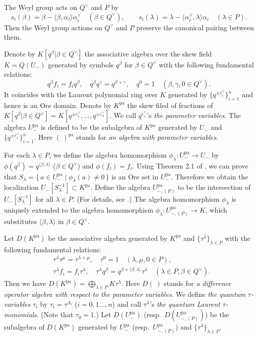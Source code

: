 \documentclass[12pt,twoside]{article}
\newcommand\tU{{\widetilde U}}
\newcommand\bra{\langle}
\newcommand\ket{\rangle}
\newcommand\av{\alpha^\vee}
\newcommand\eps{\varepsilon}
\newcommand\epsv{\eps^\vee}
\newcommand\Qv{Q^\vee}
\newcommand\pa{{\mathrm{pa}}}
\theoremstyle{plain} %
\theoremstyle{definition} %
\theoremstyle{definition} %
\numberwithin{theorem}{section}
\numberwithin{equation}{section}
\numberwithin{figure}{section}
\numberwithin{table}{section}
\begin{document}
The Weyl group acts on $\Qv$ and $P$ by
\begin{equation*}
 s_i(\beta) = \beta - \bra\beta,\alpha_i\ket\av_i \quad (\beta\in\Qv), \qquad
 s_i(\lambda) = \lambda - \bra\av_i,\lambda\ket\alpha_i \quad (\lambda\in P).
\end{equation*}
Then the Weyl group actions on $\Qv$ and $P$ preserve the canonical pairing
between them.
 
Denote by $K[q^\beta|\beta\in\Qv]$ the associative algebra over 
the skew field $K=Q(U_-)$ generated by symbols $q^\beta$
for $\beta\in\Qv$ with the following fundamental relations:
\begin{equation*}
 q^\beta f_i = f_i q^\beta, \quad
 q^\beta q^\gamma = q^{\beta+\gamma}, \quad
 q^0 = 1 \quad (\beta,\gamma,0\in\Qv).
\end{equation*}
It coincides with the Laurent polynomial ring over $K$ 
generated by $\{q^{\pm\epsv_i}\}_{i=1}^n$ 
and hence is an Ore domain.
Denote by $K^\pa$ the skew filed of fractions 
of $K[q^\beta|\beta\in\Qv]=K[q^{\pm\epsv_1},\ldots,q^{\pm\epsv_n}]$.
We call $q^{\epsv_i}$'s {\em the parameter variables}. 
The algebra $U_-^\pa$ %
is defined to be the subalgebra of $K^\pa$
generated by $U_-$ %
and $\{q^{\pm\epsv_i}\}_{i=1}^n$.
Here $(\ )^\pa$ stands for {\em an algebra with parameter variables}.

For each $\lambda\in P$, 
we define the algebra homomorphism $\phi_\lambda:U_-^\pa\to U_-$ 
by $\phi(q^\beta)=q^{\bra\beta,\lambda\ket}$ ($\beta\in\Qv$) 
and $\phi(f_i)=f_i$.
Using Theorem 2.1 of \cite{S-1971}, we can prove that 
$S_\lambda = \{\, a\in U_-^\pa \mid \phi_\lambda(a)\ne 0\,\}$
is an Ore set in $U_-^\pa$. Therefore we obtain the localization
$U_-[S_\lambda^{-1}]\subset K^\pa$.
Define the algebra $U_{-,(P)}^\pa$ to be the intersection 
of $U_-[S_\lambda^{-1}]$ for all $\lambda\in P$.
(For details, see \cite{Kuroki2012a}.)
The algebra homomorphism $\phi_\lambda$ is uniquely extended to
the algebra homomorphism $\phi_\lambda:U_{-,(P)}^\pa\to K$,
which substitutes $\bra\beta,\lambda\ket$ in $\beta\in\Qv$.

Let $D(K^\pa)$ be the associative algebra generated by $K^\pa$ and $\{\tau^\lambda\}_{\lambda\in P}$
with the following fundamental relations:
\begin{align*}
 &
 \tau^\lambda\tau^\mu = \tau^{\lambda+\mu}, \quad
 \tau^0 = 1 \quad (\lambda,\mu,0\in P),
 \\ &
 \tau^\lambda f_i = f_i \tau^\lambda, \quad
 \tau^\lambda q^\beta = q^{\beta + \bra\beta,\lambda\ket} \tau^\lambda \quad
 (\lambda\in P, \beta\in\Qv). 
\end{align*}
Then we have $D(K^\pa) = \bigoplus_{\lambda\in P} K \tau^\lambda$.
Here $D(\ )$ stands for 
{\em a difference operator algebra with respect to the parameter variables}.
We define {\em the quantum $\tau$-variables} $\tau_i$ 
by $\tau_i=\tau^{\Lambda_i}$
($i=0,1\ldots,n$) and call $\tau^\lambda$'s 
{\em the quantum Laurent $\tau$-monomials}.
(Note that $\tau_0=1$.)
Let $D(U_-^\pa)$ (resp.\ $D(U_{-,(P)}^\pa)$) 
be the subalgebra of $D(K^\pa)$ generated by 
$U_-^\pa$ (resp.\ $U_{-,(P)}^\pa$) and $\{\tau^\lambda\}_{\lambda\in P}$.
\end{document}
